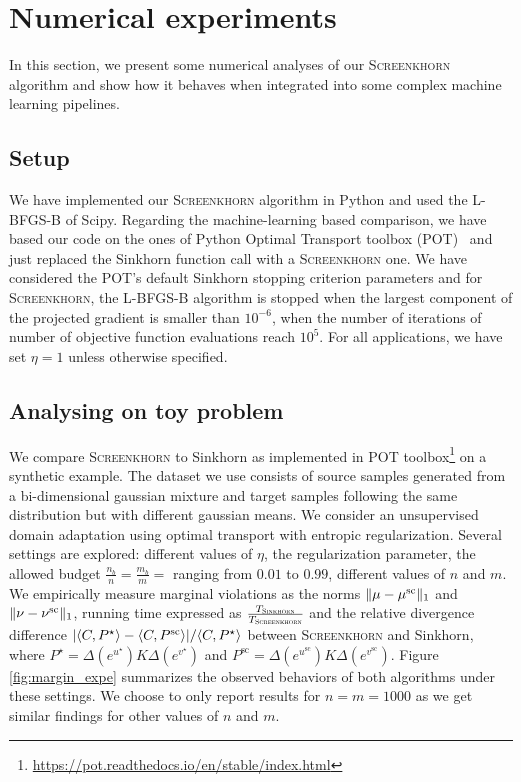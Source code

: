 
\section{Numerical experiments} %
\label{sec:numerical_experiments}

In this section, we present some numerical analyses of our
\textsc{Screenkhorn} algorithm and show how it behaves when
integrated into some complex machine learning pipelines.

\subsection{Setup}

We have implemented our \textsc{Screenkhorn} algorithm in Python and used the L-BFGS-B of
Scipy. Regarding the machine-learning based comparison, we have based our code
on the ones of Python Optimal Transport toolbox (POT)~\citep{flamary2017pot} and just replaced the Sinkhorn function call with a \textsc{Screenkhorn} one. We have considered the POT's default Sinkhorn stopping criterion parameters and for \textsc{Screenkhorn}, the L-BFGS-B algorithm is stopped when the 
largest component of the projected gradient is smaller than $10^{-6}$, when the number of iterations of number of objective function evaluations reach $10^{5}$. For all applications, we have set $\eta=1$ unless otherwise specified.

\subsection{Analysing on toy problem}

We compare \textsc{Screenkhorn} to Sinkhorn as implemented in POT toolbox\footnote{\url{https://pot.readthedocs.io/en/stable/index.html}} on  a synthetic example. The dataset we use consists of source samples generated from a bi-dimensional gaussian mixture and target samples following the same distribution but with different gaussian means. We consider an unsupervised domain adaptation using optimal transport with entropic regularization.  Several settings are explored: different values of $\eta$, the regularization parameter, the allowed budget $\frac{n_b}{n} = \frac{m_b}{m} = $ ranging from $0.01$ to $0.99$, different values of $n$ and $m$.
 We empirically measure  marginal violations as the norms $\|{\mu} -{\mu}^{\text{sc}}\|_1$ and $\|{\nu} -{\nu}^{\text{sc}}\|_1$, running time expressed as $\frac{T_{\textsc{Sinkhorn}}}{T_{\text{\textsc{Screenkhorn}}}}$ and the relative divergence difference $| \langle C, P^\star \rangle - \langle C, P^{\text{sc}} \rangle|/\langle C, P^\star \rangle$ between \textsc{Screenkhorn} and Sinkhorn, where $P^\star = \Delta(e^{u^\star}) K \Delta(e^{v^\star})$ and $P^{\text{sc}} = \Delta(e^{u^{\text{sc}}}) K \Delta(e^{v^{\text{sc}}}).$
Figure \ref{fig:margin_expe} summarizes the observed behaviors of both algorithms under these settings. We choose to only report results for $n=m=1000$ as we get similar findings for other values of $n$ and $m$. 

